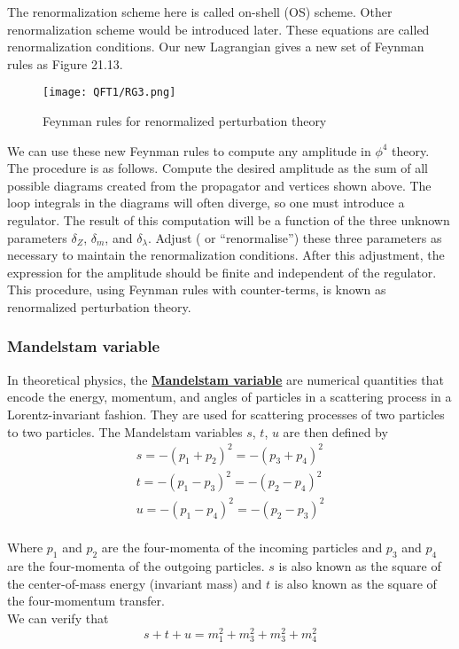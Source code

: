 \noindent
The renormalization scheme here is called on-shell (OS) scheme. Other renormalization scheme would be introduced later.
These equations are called renormalization conditions.
Our new Lagrangian gives a new set of Feynman rules as Figure 21.13.
\begin{figure}[!h]
\centering
\texttt{[image: QFT1/RG3.png]}
\caption{Feynman rules for renormalized perturbation theory}
\end{figure}

\noindent
We can use these new Feynman rules to compute any amplitude in $\phi^4$ theory. The procedure is as follows. Compute the desired amplitude as the sum of all possible diagrams created from the propagator and vertices shown above. The loop integrals in the diagrams will often diverge, so one must introduce a regulator. The result of this computation will be a function of the three unknown parameters $\delta_Z$, $\delta_m$, and $\delta_{\lambda}$. Adjust ( or ``renormalise'') these three parameters as necessary to maintain the renormalization conditions. After this adjustment, the expression for the amplitude should be finite and independent of the regulator.
\\
This procedure, using Feynman rules with counter-terms, is known as renormalized perturbation theory. 

\subsubsection{Mandelstam variable}
In theoretical physics, the \href{https://en.wikipedia.org/wiki/Mandelstam_variables}{\textbf{Mandelstam variable}}  are numerical quantities that encode the energy, momentum, and angles of particles in a scattering process in a Lorentz-invariant fashion. They are used for scattering processes of two particles to two particles. 
The Mandelstam variables $s$, $t$, $u$ are then defined by
\begin{eqnarray}
s=-(p_{1}+p_{2})^{2}=-(p_{3}+p_{4})^{2} \nonumber \\
t=-(p_{1}-p_{3})^{2}=-(p_{2}-p_{4})^{2} \nonumber \\
u=-(p_{1}-p_{4})^{2}=-(p_{2}-p_{3})^{2} \nonumber
\end{eqnarray}
\\
Where $p_1$ and $p_2$ are the four-momenta of the incoming particles and $p_3$ and $p_4$ are the four-momenta of the outgoing particles.
$s$ is also known as the square of the center-of-mass energy (invariant mass) and $t$ is also known as the square of the four-momentum transfer.\\
We can verify that
\[s+t+u = m_1^2 + m_3^2 + m_3^2 +m_4^2\]

